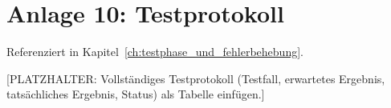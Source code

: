 \section*{Anlage 10: Testprotokoll}
\label{anh:testprotokoll}
Referenziert in Kapitel~\ref{ch:testphase_und_fehlerbehebung}.

[PLATZHALTER: Vollst\"andiges Testprotokoll (Testfall, erwartetes Ergebnis,
tats\"achliches Ergebnis, Status) als Tabelle einf\"ugen.]

